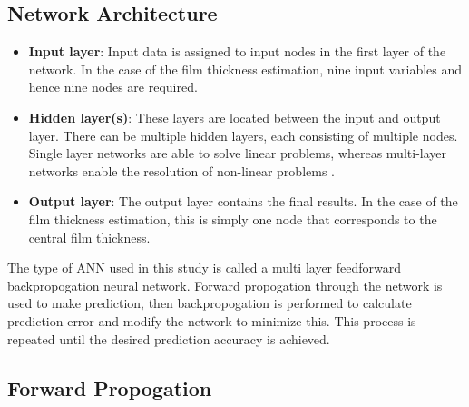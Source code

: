 \subsection{Network Architecture}
\begin{itemize}
	\item \textbf{Input layer}: Input data is assigned to input nodes in the first layer of the network. In the case of the film thickness estimation, nine input variables and hence nine nodes are required.
	\item \textbf{Hidden layer(s)}: These layers are located between the input and output layer. There can be multiple hidden layers, each consisting of multiple nodes. Single layer networks are able to solve linear problems, whereas multi-layer networks enable the resolution of non-linear problems \cite{Bell2014}.
	\item \textbf{Output layer}: The output layer contains the final results. In the case of the film thickness estimation, this is simply one node that corresponds to the central film thickness.
\end{itemize}

The type of ANN used in this study is called a multi layer feedforward backpropogation neural network. Forward propogation through the network is used to make prediction, then backpropogation is performed to calculate prediction error and modify the network to minimize this. This process is repeated until the desired prediction accuracy is achieved.

\subsection{Forward Propogation}

